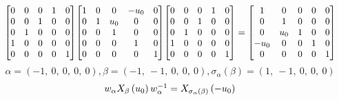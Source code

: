 \documentclass[11pt]{article}
\theoremstyle{definition}
\begin{document}
\[
\scaletoalign{\textwidth}{{\left[\begin{matrix}0 & 0 & 0 & 1 & 0\\0 & 0 & 1 & 0 & 0\\0 & 1 & 0 & 0 & 0\\1 & 0 & 0 & 0 & 0\\0 & 0 & 0 & 0 & 1\end{matrix}\right]} {\left[\begin{matrix}1 & 0 & 0 & - u_{0} & 0\\0 & 1 & u_{0} & 0 & 0\\0 & 0 & 1 & 0 & 0\\0 & 0 & 0 & 1 & 0\\0 & 0 & 0 & 0 & 1\end{matrix}\right]} {\left[\begin{matrix}0 & 0 & 0 & 1 & 0\\0 & 0 & 1 & 0 & 0\\0 & 1 & 0 & 0 & 0\\1 & 0 & 0 & 0 & 0\\0 & 0 & 0 & 0 & 1\end{matrix}\right]} = {\left[\begin{matrix}1 & 0 & 0 & 0 & 0\\0 & 1 & 0 & 0 & 0\\0 & u_{0} & 1 & 0 & 0\\- u_{0} & 0 & 0 & 1 & 0\\0 & 0 & 0 & 0 & 1\end{matrix}\right]}}
\]
\[
\alpha = \left( -1, \  0, \  0, \  0, \  0\right), \beta = \left( -1, \  -1, \  0, \  0, \  0\right), \sigma_{\alpha}(\beta) = \left( 1, \  -1, \  0, \  0, \  0\right)
\]
\[
\scaletoalign{\textwidth}{w_{\alpha} X_{\beta}\left(u_{0}\right) w_{\alpha}^{-1} = X_{\sigma_{\alpha}\left(\beta\right)}\left(- u_{0}\right)}
\]
\end{document}
